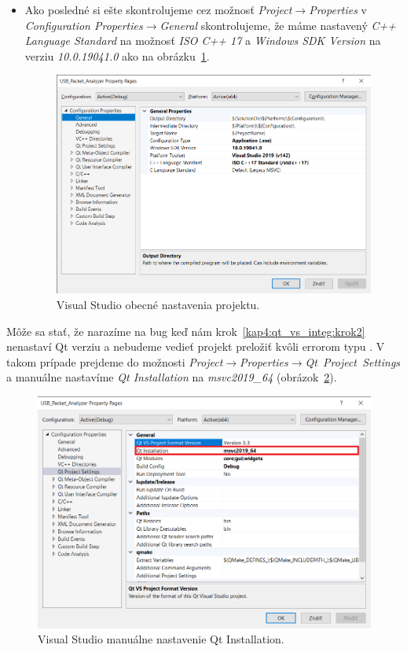 \begin{itemize}
\item Ako posledné si ešte skontrolujeme cez možnosť \textit{Project}$\rightarrow$\textit{Properties} v \textit{Configuration Properties}$\rightarrow$\textit{General} skontrolujeme, že máme nastavený \textit{C++ Language Standard} na možnosť \textit{ISO C++ 17} a \textit{Windows SDK Version} na verziu \textit{10.0.19041.0} ako na obrázku~\ref{obr:kap4:vs_prop}.

\begin{figure}[!htb]
	\centering
	\includegraphics[width=12cm]{img/kap04_vs_prop}
	\caption{Visual Studio obecné nastavenia projektu.}
	\label{obr:kap4:vs_prop}
\end{figure}

\end{itemize}

Môže sa stať, že narazíme na bug keď nám krok~\ref{kap4:qt_vs_integ:krok2} nenastaví Qt verziu a nebudeme vedieť projekt preložiť kvôli errorom typu . V takom prípade prejdeme do možnosti \textit{Project}$\rightarrow$\textit{Properties}$\rightarrow$\textit{Qt~Project~Settings} a manuálne nastavíme \textit{Qt Installation} na \textit{msvc2019\_64} (obrázok~\ref{obr:kap4:vs_manual}).

\begin{figure}[!htb]
	\centering
	\includegraphics[width=12cm]{img/kap04_vs_manual}
	\caption{Visual Studio manuálne nastavenie Qt Installation.}
	\label{obr:kap4:vs_manual}
\end{figure}

